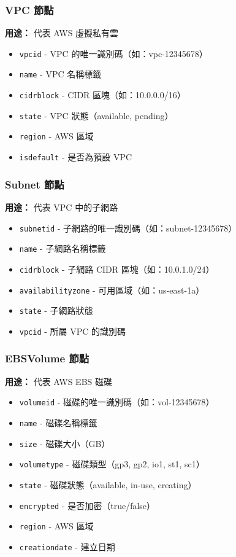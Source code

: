\documentclass[11pt,a4paper]{ctexart}
\begin{document}
\subsubsection{VPC 節點}
\textbf{用途：} 代表 AWS 虛擬私有雲
\begin{itemize}[leftmargin=1.5em]
\item \texttt{vpcid} - VPC 的唯一識別碼（如：vpc-12345678）
\item \texttt{name} - VPC 名稱標籤
\item \texttt{cidrblock} - CIDR 區塊（如：10.0.0.0/16）
\item \texttt{state} - VPC 狀態（available, pending）
\item \texttt{region} - AWS 區域
\item \texttt{isdefault} - 是否為預設 VPC
\end{itemize}

\subsubsection{Subnet 節點}
\textbf{用途：} 代表 VPC 中的子網路
\begin{itemize}[leftmargin=1.5em]
\item \texttt{subnetid} - 子網路的唯一識別碼（如：subnet-12345678）
\item \texttt{name} - 子網路名稱標籤
\item \texttt{cidrblock} - 子網路 CIDR 區塊（如：10.0.1.0/24）
\item \texttt{availabilityzone} - 可用區域（如：us-east-1a）
\item \texttt{state} - 子網路狀態
\item \texttt{vpcid} - 所屬 VPC 的識別碼
\end{itemize}

\subsubsection{EBSVolume 節點}
\textbf{用途：} 代表 AWS EBS 磁碟
\begin{itemize}[leftmargin=1.5em]
\item \texttt{volumeid} - 磁碟的唯一識別碼（如：vol-12345678）
\item \texttt{name} - 磁碟名稱標籤
\item \texttt{size} - 磁碟大小（GB）
\item \texttt{volumetype} - 磁碟類型（gp3, gp2, io1, st1, sc1）
\item \texttt{state} - 磁碟狀態（available, in-use, creating）
\item \texttt{encrypted} - 是否加密（true/false）
\item \texttt{region} - AWS 區域
\item \texttt{creationdate} - 建立日期
\end{itemize}
\end{document}
